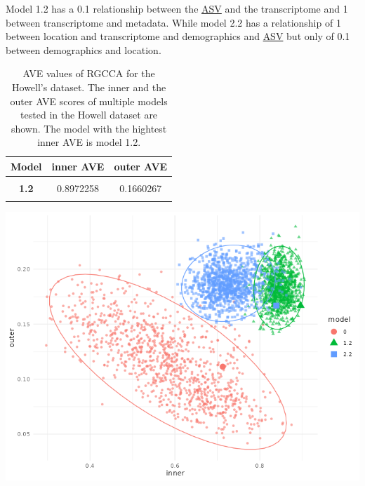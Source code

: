 \documentclass[
  12pt,
  a4paper,
  twoside,
  openright]{book}
\let\origfigure\figure
\let\endorigfigure\endfigure
\renewenvironment{figure}[1][2] {
    \expandafter\origfigure\expandafter[!htbp]
} {
    \endorigfigure
}
\begin{document}
Model 1.2 has a 0.1 relationship between the \protect\hyperlink{acronyms_ASV}{ASV} and the transcriptome and 1 between transcriptome and metadata.
While model 2.2 has a relationship of 1 between location and transcriptome and demographics and \protect\hyperlink{acronyms_ASV}{ASV} but only of 0.1 between demographics and location.

\begin{table}[H]

\caption[AVE values of RGCCA for the Howell's dataset.]{\label{tab:howell-models-ave}AVE values of RGCCA for the Howell's dataset. The inner and the outer AVE scores of multiple models tested in the Howell dataset are shown. The model with the hightest inner AVE is model 1.2.}
\centering
\begin{tabular}[t]{>{}c|c|c}
\hline
\textbf{Model} & \textbf{inner AVE} & \textbf{outer AVE}\\
\hline
\textbf{\cellcolor{gray!6}{0.0}} & \cellcolor{gray!6}{0.7180980} & \cellcolor{gray!6}{0.1112390}\\
\hline
\textbf{1.2} & 0.8972258 & 0.1660267\\
\hline
\textbf{\cellcolor{gray!6}{2.2}} & \cellcolor{gray!6}{0.8433274} & \cellcolor{gray!6}{0.1659844}\\
\hline
\end{tabular}
\end{table}

\begin{figure}
\includegraphics[width=1\linewidth]{images/howells_models_bootstrap} \caption[Bootstrap of models in Howell's datset.]{Bootstrap of models in Howell's datset. Bootstrap of the different models on the inner and outer AVE: Model 0 has just trancriptomic and microbiome data, model 1.2 has transcriptomic, microbiome and sample data and model 2.2 has transcriptomic, microbiome and sample data split in different blocks. The bigger points are the models on the original dataset. Each point represents a bootstrapped sample (colored by model used).
The dispersion is shown by the ellipses.}\label{fig:howell-bootstrap}
\end{figure}
\end{document}
